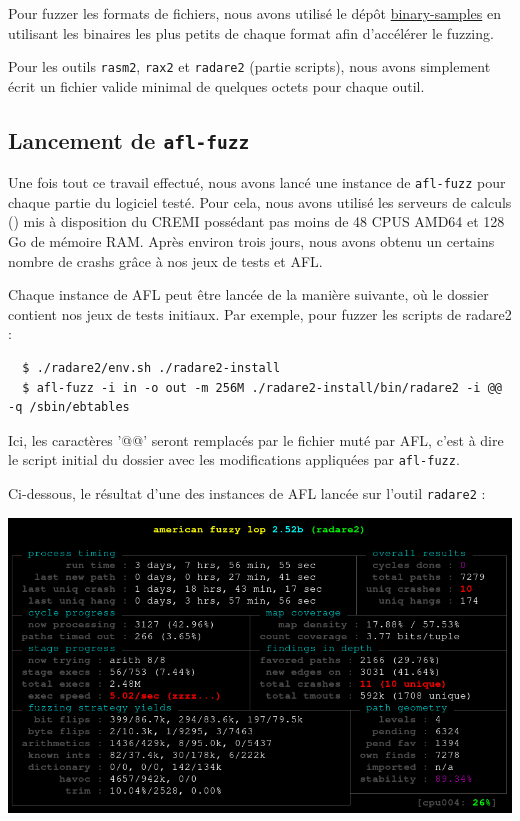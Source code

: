 Pour fuzzer les formats de fichiers, nous avons utilisé le dépôt \href{https://github.com/JonathanSalwan/binary-samples}{binary-samples} en utilisant les binaires les plus petits de chaque format afin d'accélérer le fuzzing.

Pour les outils \lstinline{rasm2}, \lstinline{rax2} et \lstinline{radare2} (partie scripts), nous avons simplement écrit un fichier valide minimal de quelques octets pour chaque outil.

\subsection{Lancement de \lstinline{afl-fuzz}}

Une fois tout ce travail effectué, nous avons lancé une instance de \lstinline{afl-fuzz} pour chaque partie du logiciel testé.
Pour cela, nous avons utilisé les serveurs de calculs () mis à disposition du CREMI possédant pas moins de 48 CPUS AMD64 et 128 Go de mémoire RAM.
Après environ trois jours, nous avons obtenu un certains nombre de crashs grâce à nos jeux de tests et AFL.

Chaque instance de AFL peut être lancée de la manière suivante, où le dossier  contient nos jeux de tests initiaux.
Par exemple, pour fuzzer les scripts de radare2 :

\begin{lstlisting}
  $ ./radare2/env.sh ./radare2-install
  $ afl-fuzz -i in -o out -m 256M ./radare2-install/bin/radare2 -i @@ -q /sbin/ebtables
\end{lstlisting}

Ici, les caractères '@@' seront remplacés par le fichier muté par AFL, c'est à dire le script initial du dossier  avec les modifications appliquées par \lstinline{afl-fuzz}.

Ci-dessous, le résultat d'une des instances de AFL lancée sur l'outil \lstinline{radare2} :

\includegraphics[width=0.9\linewidth]{../medias/afl-fuzz.png}

